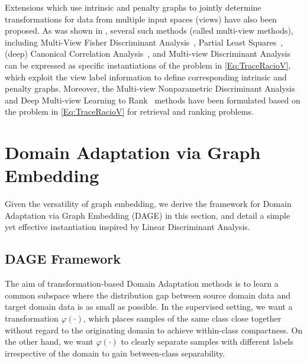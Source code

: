 \documentclass[journal]{IEEEtran}
\begin{document}
Extensions which use intrinsic and penalty graphs to jointly determine transformations for data from multiple input spaces (views) have also been proposed. As was shown in \cite{cao2018generalized}, several such methods (called multi-view methods), including
Multi-View Fisher Discriminant Analysis~\cite{diethe2008multiview}, Partial Least Squares~\cite{wold1984collinearity}, (deep) Canonical Correlation Analysis~\cite{andrew2013dcca}, and Multi-view Discriminant Analysis~\cite{kan2016mvda} can be expressed as specific instantiations of the problem in \cref{Eq:TraceRacioV}, which exploit the view label information to define corresponding intrinsic and penalty graphs. Moreover, the Multi-view Nonparametric Discriminant Analysis~\cite{cao2017mvnda} and Deep Multi-view Learning to Rank~\cite{cao2019deepMVLR} methods have been formulated based on the problem in \cref{Eq:TraceRacioV} for retrieval and ranking problems.


\section{Domain Adaptation via Graph Embedding}
\label{sec:dage}
Given the versatility of graph embedding, we derive the framework for Domain Adaptation via Graph Embedding (DAGE) in this section, and detail a simple yet effective instantiation inspired by Linear Discriminant Analysis.


\subsection{DAGE Framework}
The aim of transformation-based Domain Adaptation methods is to learn a common subspace where the distribution gap between source domain data and target domain data is as small as possible. In the supervised setting, we want a transformation $\varphi(\cdot)$, which places samples of the same class close together without regard to the originating domain to achieve within-class compactness. On the other hand, we want $\varphi(\cdot)$ to clearly separate samples with different labels irrespective of the domain to gain between-class separability.
\end{document}
